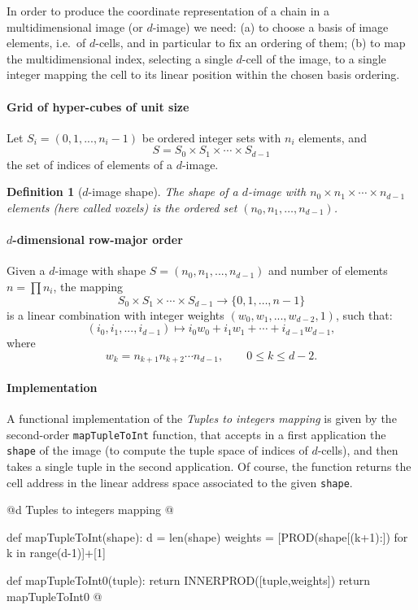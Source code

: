 \documentclass[11pt,oneside]{article}	%
\newtheorem{definition}{Definition}
\begin{document}
In order to produce the coordinate representation of a chain in a multidimensional image (or $d$-image) we need: (a) to choose a basis of image elements, i.e.~of $d$-cells, and in particular to fix an ordering of them; (b) to map the multidimensional index, selecting a single $d$-cell of the image, to a single integer mapping the cell to its linear position within the chosen basis ordering. 


\paragraph{Grid of hyper-cubes of unit size}
Let $S_i=(0,1,...,n_i-1)$ be ordered integer sets with $n_i$ elements, and 
\[
S= S_0 \times S_1 \times \cdots \times S_{d-1}
\] 
the set of indices of elements of a $d$-image.

\begin{definition}[$d$-image shape]
The \emph{shape} of a $d$-image with $n_0\times n_1 \times\cdots\times n_{d-1}$ elements (here called \emph{voxels}) is the ordered set $(n_0, n_1, \ldots, n_{d-1})$.
\end{definition}


\paragraph{$d$-dimensional row-major order}

Given a $d$-image with shape $S=(n_0,n_1,...,n_{d-1})$ and number of elements $n=\prod n_i$, 
the mapping  
\[
S_0 \times S_1 \times \cdots \times S_{d-1} \to \{ 0, 1, \ldots, n-1\}
\]
 is a {linear combination} with integer {weights}  $(w_0,w_1,...,w_{d-2},1)$, such that:
\[
(i_0,i_1,...,i_{d-1}) \mapsto i_0 w_0 +i_1 w_1 +\cdots +i_{d-1} w_{d-1},
\]
where 
\[
w_k = n_{k+1}  n_{k+2} \cdots  n_{d-1}, \qquad 0\leq k\leq d-2.
\]

\paragraph{Implementation}
A functional implementation of the \emph{Tuples to integers mapping} is given by the second-order  \texttt{mapTupleToInt} function, that  accepts in a first application the \texttt{shape} of the image (to compute the tuple space of indices of $d$-cells), and then takes a single tuple in the second application. Of course, the function  returns the cell address in the linear address space associated to the given \texttt{shape}.

@d Tuples to integers mapping
@{def mapTupleToInt(shape):
	d = len(shape)
	weights = [PROD(shape[(k+1):]) for k in range(d-1)]+[1]
	
	def mapTupleToInt0(tuple):
		return INNERPROD([tuple,weights])
	return mapTupleToInt0
@}
\end{document}
